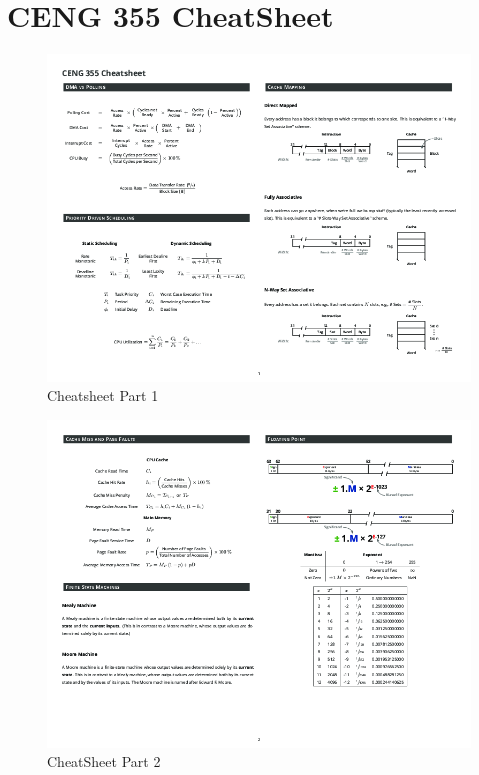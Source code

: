 \chapter{CENG 355 CheatSheet}
\renewcommand\labelitemi{---}
\setlength{\fboxrule}{2pt}%


	\begin{figure}
		\centering
		\includegraphics[width=1\linewidth]{CENG355/Ceng355-0.png}
		\caption{Cheatsheet Part 1}
		\label{fig:ceng355-0}
	\end{figure}
	\begin{figure}
		\centering
		\includegraphics[width=1\linewidth]{CENG355/Ceng355-1.png}
		\caption{CheatSheet Part 2}
		\label{fig:ceng355-1}
	\end{figure}
